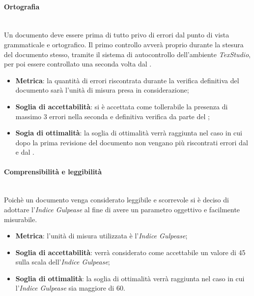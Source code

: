 \paragraph{Ortografia}
~\\Un documento deve essere prima di tutto privo di errori dal punto di vista grammaticale e ortografico. 
Il primo controllo avverà proprio durante la stesura del documento stesso, tramite il sistema di autocontrollo dell'ambiente  \emph{TexStudio}, per poi essere controllato una seconda volta dal \ver{}.
\begin{itemize}
	\item \textbf{Metrica}: la quantità di errori riscontrata durante la verifica definitiva del documento sarà l'unità di misura presa in considerazione;
	\item \textbf{Soglia di accettabilità}: si è accettata come tollerabile la presenza di massimo 3 errori nella seconda e definitiva verifica da parte del \ver{};
	\item \textbf{Sogia di ottimalità}: la soglia di ottimalità verrà raggiunta nel caso in cui dopo la prima revisione del documento non vengano più riscontrati errori dal \ver{} e dal \RdP{}.
\end{itemize}

\paragraph{Comprensibilità e leggibilità}
~\\Poichè un documento venga considerato leggibile e scorrevole si è deciso di adottare l'\emph{Indice Gulpease} al fine di avere un parametro oggettivo e facilmente misurabile.
\begin{itemize}
	\item \textbf{Metrica}: l'unità di misura utilizzata è l'\emph{Indice Gulpease};
	\item \textbf{Soglia di accettabilità}: verrà considerato come accettabile un valore di 45 sulla scala dell'\emph{Indice Gulpease};
	\item \textbf{Soglia di ottimalità}: la soglia di ottimalità verrà raggiunta nel caso in cui l'\emph{Indice Gulpease} sia maggiore di 60.
\end{itemize}

